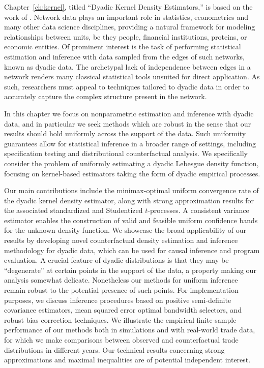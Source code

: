 Chapter~\ref{ch:kernel}, titled ``Dyadic Kernel Density Estimators,'' is based
on the work of \cite{cattaneo2024uniform}.
Network data plays an important role in statistics, econometrics and many other
data science disciplines, providing a natural framework for modeling
relationships between units, be they people, financial institutions, proteins,
or economic entities. Of prominent interest is the task of performing
statistical estimation and inference with data sampled from the edges of such
networks, known as dyadic data. The archetypal lack of independence between
edges in a network renders many classical statistical tools unsuited for direct
application. As such, researchers must appeal to techniques tailored to dyadic
data in order to accurately capture the complex structure present in the
network.

In this chapter we focus on nonparametric estimation and inference with dyadic
data, and in particular we seek methods which are robust in the sense that our
results should hold uniformly across the support of the data.
Such uniformity guarantees allow for statistical inference in a broader range of
settings, including specification testing and distributional
counterfactual analysis. We specifically
consider the problem of uniformly estimating a dyadic Lebesgue density
function, focusing on kernel-based estimators taking the form of dyadic
empirical processes.

Our main contributions include the minimax-optimal uniform convergence rate of
the dyadic kernel density estimator, along with strong approximation results
for the associated standardized and Studentized $t$-processes. A consistent
variance estimator enables the construction of valid and feasible uniform
confidence bands for the unknown density function. We showcase the broad
applicability of our results by developing novel counterfactual density
estimation and inference methodology for dyadic data, which can be used for
causal inference and program evaluation.
A crucial feature of dyadic distributions is that they may be ``degenerate'' at
certain points in the support of the data, a property making our analysis
somewhat delicate. Nonetheless our methods for uniform inference remain robust
to the potential presence of such points.
For implementation purposes, we discuss inference procedures based on positive
semi-definite covariance estimators, mean squared error optimal bandwidth
selectors, and robust bias correction techniques. We illustrate the empirical
finite-sample performance of our methods both in simulations and with
real-world trade data, for which we make comparisons between observed and
counterfactual trade distributions in different years. Our technical results
concerning strong approximations and maximal inequalities are of potential
independent interest.

